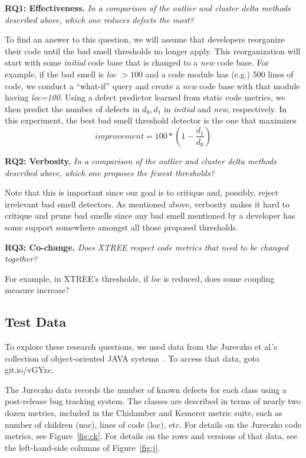 \documentclass{sig-alternate}
\newcommand{\fig}[1]{Figure~\ref{fig:#1}}
\begin{document}
\begin{itemize}
{\bf RQ1: Effectiveness.} {\em In a comparison of  the outlier and cluster delta
methods described above, which one reduces defects the most?}

To find an answer to this question, we will assume that developers
reorganize their code until the bad smell thresholds no longer apply.
This reorganization will start with some {\em initial} code
base that is changed to a {\em new} code base. 
For example, if the bad smell is {\em loc $>100$} and a 
code module has (e.g.) 500 lines of code, we conduct a ``what-if''
query and create a {\em new} code base with that module having {\em loc=100}.
Using a defect
predictor learned from static code metrics, we then predict the
number of defects in $d_0,d_1$ in {\em initial} and {\em new},
respectively. In this experiment,
the best bad smell threshold detector is the one that maximizes
\begin{equation}\label{eq:diff}
\mathit{improvement} = 100* \left(1 - \frac{ d_1 }{ d_0}\right)
\end{equation}

{\bf RQ2: Verbosity.}   {\em In a comparison of  the outlier and cluster delta
methods described above, which one proposes the fewest thresholds?}

Note that this is important since our goal is to critique and, possibly,
reject irrelevant bad smell detectors. As mentioned above,
  verbosity makes it hard   to critique and prune bad smells
since any bad smell mentioned by a developer has some support
somewhere amongst all those proposed thresholds.

{\bf RQ3: Co-change.}   {\em Does XTREE respect code
metrics that need to be changed together? }

For example, in XTREE's thresholds,  if {\em loc} is
reduced, does some coupling measure increase?

 


\subsection{Test Data}\label{sect:tesd}

To explore these research questions,
we used data from
the Jureczko et al.'s collection of object-oriented JAVA systems~\cite{jureczko10}. To access that data, goto   git.io/vGYxc.

The Jureczko data records the number of known defects for each class using a post-release bug tracking system. The classes are described in terms of nearly two dozen metrics, included in the Chidamber and Kemerer metric suite, such as number of children (noc), lines of code (loc), etc. For details on the Jureczko code
metrics, see  \fig{ck}. For details on the rows and versions
of that data, see the left-hand-side columns of \fig{j}.



\end{itemize}
\end{document}
